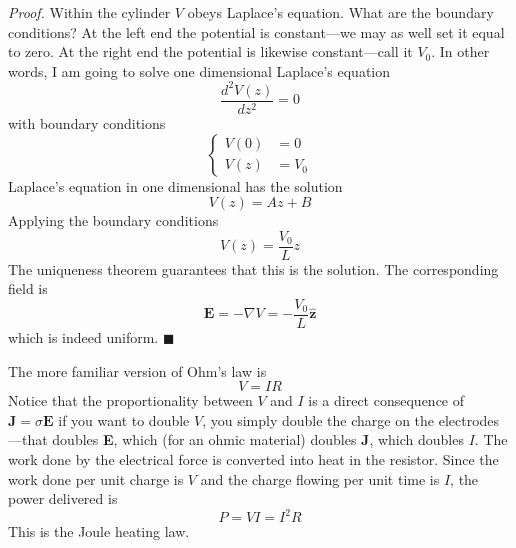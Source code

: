 \documentclass[../../../main.tex]{subfiles}
\begin{document}
\emph{Proof.} Within the cylinder $V$ obeys Laplace's equation. What are the boundary conditions? At the left end the potential is constant—we may as well set it equal to zero. At the right end the potential is likewise constant—call it $V_0$. In other words, I am going to solve one dimensional Laplace's equation
\begin{equation*}
    \frac{d^2 V(z)}{d z^2}=0
\end{equation*}
with boundary conditions
\begin{equation*}
    \begin{cases}
        V(0)&=0\\
        V(z)&=V_0
    \end{cases}
\end{equation*}
Laplace's equation in one dimensional has the solution
\begin{equation*}
    V(z)=Az+B
\end{equation*}
Applying the boundary conditions
\begin{equation*}
    V(z)=\frac{V_0}{L}z
\end{equation*}
The uniqueness theorem guarantees that this is the solution. The corresponding ﬁeld is
\begin{equation*}
    \mathbf{E}=-\nabla V=-\frac{V_0}{L}\mathbf{\hat{z}}
\end{equation*}
which is indeed uniform. $\blacksquare$

The more familiar version of Ohm's law is 
\begin{equation*}
    V=IR
\end{equation*}
Notice that the proportionality between $V$ and $I$ is a direct consequence of $\mathbf{J}=\sigma\mathbf{E}$ if you want to double $V$, you simply double the charge on the electrodes—that doubles \textbf{E}, which (for an ohmic material) doubles \textbf{J}, which doubles $I $. The work done by the electrical force is converted into heat in the resistor. Since the work done per unit charge is $V$ and the charge ﬂowing per unit time is $I $, the power delivered is
\begin{equation*}
    P=VI=I^2R
\end{equation*}
This is the Joule heating law.
\end{document}
